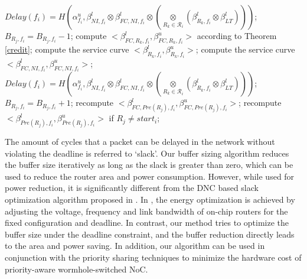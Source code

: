 \documentclass[preprint]{elsarticle}
\begin{document}
\begin{algorithm}
\begin{algorithmic}[1]
            \State $Delay(f_i)=H(\alpha_{f_i}^u,\beta_{NI,f_i}^l\otimes\beta^l_{FC,NI,f_i}\otimes (\underset{R_k\in\mathcal{R}_{i}}{\otimes}(\beta^l_{R_k,f_i}\otimes\beta^l_{LT})))$;
                \State $B_{R_j,f_i}=B_{R_j,f_i}-1$;
                    \State compute $<\beta_{FC,R_k,f_i}^l,\beta_{FC,R_k,f_i}^u>$ according to Theorem \ref{credit};
                    \State compute the service curve $<\beta_{R_k,f_i}^l,\beta_{R_k,f_i}^u>$;
                \EndFor
                \State compute the service curve $<\beta_{FC,NI,f_i}^l,\beta_{FC,NI,f_i}^u>$;
                \State $Delay(f_i)=H(\alpha_{f_i}^u,\beta_{NI,f_i}^l\otimes\beta^l_{FC,NI,f_i}\otimes (\underset{R_k\in\mathcal{R}_{i}}{\otimes}(\beta^l_{R_k,f_i}\otimes\beta^l_{LT})))$;
            \EndWhile
                \State $B_{R_j,f_i}=B_{R_j,f_i}+1$;
                \State recompute $<\beta_{FC,Pre(R_j),f_i}^l,\beta_{FC,Pre(R_j),f_i}^u>$;
                \State recompute $<\beta_{Pre(R_j),f_i}^l,\beta_{Pre(R_j),f_i}^u>$ if $R_j\neq start_i$;
            \EndIf
        \EndFor
\EndProcedure
\end{algorithmic}
\end{algorithm}

The amount of cycles that a packet can be delayed in the network without violating the deadline is referred to `slack'. Our buffer sizing algorithm reduces the buffer size iteratively as long as the slack is greater than zero, which can be used to reduce the router area and power consumption. However, while used for power reduction, it is significantly different from the DNC based slack optimization algorithm proposed in \cite{6560630}. In \cite{6560630}, the energy optimization is achieved by adjusting the voltage, frequency and link bandwidth of on-chip routers for the fixed configuration and deadline. In contrast, our method tries to optimize the buffer size under the deadline constraint, and the buffer reduction directly leads to the area and power saving. In addition, our algorithm can be used in conjunction with the priority sharing techniques \cite{5161497} to minimize the hardware cost of priority-aware wormhole-switched NoC.
\end{document}
